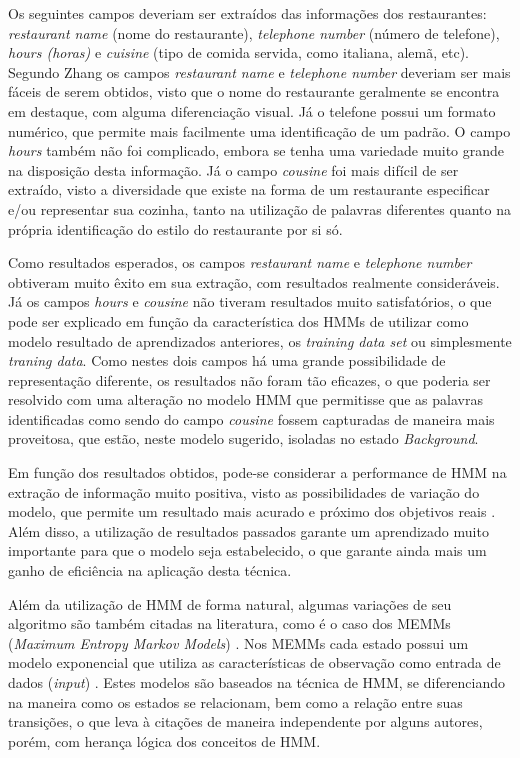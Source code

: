 \begin{textnew}
Os seguintes campos deveriam ser extraídos das informações dos restaurantes: \textit{restaurant name} (nome do restaurante), \textit{telephone number} (número de telefone), \textit{hours (horas)} e \textit{cuisine} (tipo de comida servida, como italiana, alemã, etc). Segundo Zhang \cite{Zhang-HMM-IE} os campos \textit{restaurant name} e \textit{telephone number} deveriam ser mais fáceis de serem obtidos, visto que o nome do restaurante geralmente se encontra em destaque, com alguma diferenciação visual. Já o telefone possui um formato numérico, que permite mais facilmente uma identificação de um padrão. O campo \textit{hours} também não foi complicado, embora se tenha uma variedade muito grande na disposição desta informação. Já o campo \textit{cousine} foi mais difícil de ser extraído, visto a diversidade que existe na forma de um restaurante especificar e/ou representar sua cozinha, tanto na utilização de palavras diferentes quanto na própria identificação do estilo do restaurante por si só.

Como resultados esperados, os campos \textit{restaurant name} e \textit{telephone number} obtiveram muito êxito em sua extração, com resultados realmente consideráveis. Já os campos \textit{hours} e \textit{cousine} não tiveram resultados muito satisfatórios, o que pode ser  explicado em função da característica dos HMMs de utilizar como modelo resultado de aprendizados anteriores, os \textit{training data set} ou simplesmente \textit{traning data}. Como nestes dois campos há uma grande possibilidade de representação diferente, os resultados não foram tão eficazes, o que poderia ser resolvido com uma alteração no modelo HMM que permitisse que as palavras identificadas como sendo do campo \textit{cousine} fossem capturadas de maneira mais proveitosa, que estão, neste modelo sugerido, isoladas no estado \textit{Background}.

Em função dos resultados obtidos, pode-se considerar a performance de HMM na extração de informação muito positiva, visto as possibilidades de variação do modelo, que permite um resultado mais acurado e próximo dos objetivos reais \cite{Zhang-HMM-IE}. Além disso, a utilização de resultados passados garante um aprendizado muito importante para que o modelo seja estabelecido, o que garante ainda mais um ganho de eficiência na aplicação desta técnica.

Além da utilização de HMM de forma natural, algumas variações de seu algoritmo são também citadas na literatura, como é o caso dos MEMMs (\textit{Maximum Entropy Markov Models}) \cite{maximum-entropy}. Nos MEMMs cada estado possui um modelo exponencial que utiliza as características de observação como entrada de dados (\textit{input}) \cite{Lafferty-CRF}. Estes modelos são baseados na técnica de HMM, se diferenciando na maneira como os estados se relacionam, bem como a relação entre suas transições, o que leva à citações de maneira independente por alguns autores, porém, com herança lógica dos conceitos de HMM.

\end{textnew}

